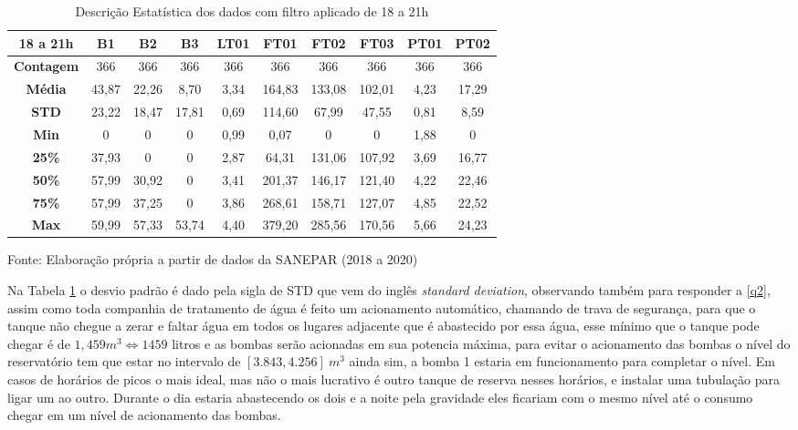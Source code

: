 \begin{table}[H]
	\centering
	\caption{Descrição Estatística dos dados com filtro aplicado de 18 a 21h}\label{tb:est}
	\begin{tabular}{@{}cccccccccc@{}}
		\toprule
		\textbf{18 a 21h}  & \textbf{B1} & \textbf{B2} & \textbf{B3} & \textbf{LT01} & \textbf{FT01} & \textbf{FT02} & \textbf{FT03} & \textbf{PT01} & \textbf{PT02} \\ \midrule
		\textbf{Contagem} & 366         & 366         & 366         & 366           & 366           & 366           & 366           & 366           & 366           \\
		\textbf{Média}    & 43,87       & 22,26       & 8,70        & 3,34          & 164,83        & 133,08        & 102,01        & 4,23          & 17,29         \\
		\textbf{STD}      & 23,22       & 18,47       & 17,81       & 0,69          & 114,60        & 67,99         & 47,55         & 0,81          & 8,59          \\
		\textbf{Min}      & 0           & 0           & 0           & 0,99          & 0,07          & 0             & 0             & 1,88          & 0             \\
		\textbf{25\%}     & 37,93       & 0           & 0           & 2,87          & 64,31         & 131,06        & 107,92        & 3,69          & 16,77         \\
		\textbf{50\%}     & 57,99       & 30,92       & 0           & 3,41          & 201,37        & 146,17        & 121,40        & 4,22          & 22,46         \\
		\textbf{75\%}     & 57,99       & 37,25       & 0           & 3,86          & 268,61        & 158,71        & 127,07        & 4,85          & 22,52         \\
		\textbf{Max}      & 59,99       & 57,33       & 53,74       & 4,40          & 379,20        & 285,56        & 170,56        & 5,66          & 24,23         \\ \bottomrule
\end{tabular}

	Fonte: Elaboração própria a partir de dados da SANEPAR (2018 a 2020)
\end{table}

Na Tabela \ref{tb:est} o desvio padrão é dado pela sigla de STD que vem do inglês \textit{standard deviation}, observando também para responder a \ref{q2}, assim como toda companhia de tratamento de água é feito um acionamento automático, chamando de trava de segurança, para que o tanque não chegue a zerar e faltar água em todos os lugares adjacente que é abastecido por essa água, esse mínimo que o tanque pode chegar é de $1,459 m^3\Longleftrightarrow 1459 $ litros e as bombas serão acionadas em sua potencia máxima, para evitar o acionamento das bombas o nível do reservatório tem que estar no intervalo de $[3.843,4.256]\ m^3$ ainda sim, a bomba 1 estaria em funcionamento para completar o nível. Em casos de horários de picos o mais ideal, mas não o mais lucrativo é outro tanque de reserva nesses horários, e instalar uma tubulação para ligar um ao outro. Durante o dia estaria abastecendo os dois e a noite pela gravidade eles ficariam com o mesmo nível até o consumo chegar em um nível de acionamento das bombas.  

